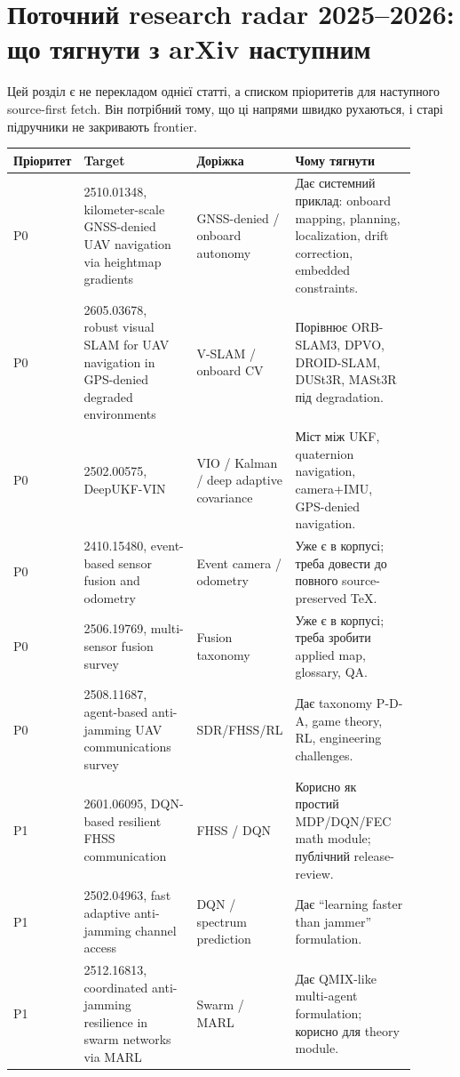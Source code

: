 \chapter{Поточний research radar 2025--2026: що тягнути з arXiv наступним}

Цей розділ є не перекладом однієї статті, а списком пріоритетів для наступного source-first fetch. Він потрібний тому, що ці напрями швидко рухаються, і старі підручники не закривають frontier.

\begin{longtable}{L{0.12\linewidth}L{0.28\linewidth}L{0.20\linewidth}L{0.30\linewidth}}
\toprule
Пріоритет & Target & Доріжка & Чому тягнути \\
\midrule
P0 & 2510.01348, kilometer-scale GNSS-denied UAV navigation via heightmap gradients & GNSS-denied / onboard autonomy & Дає системний приклад: onboard mapping, planning, localization, drift correction, embedded constraints. \\
P0 & 2605.03678, robust visual SLAM for UAV navigation in GPS-denied degraded environments & V-SLAM / onboard CV & Порівнює ORB-SLAM3, DPVO, DROID-SLAM, DUSt3R, MASt3R під degradation. \\
P0 & 2502.00575, DeepUKF-VIN & VIO / Kalman / deep adaptive covariance & Міст між UKF, quaternion navigation, camera+IMU, GPS-denied navigation. \\
P0 & 2410.15480, event-based sensor fusion and odometry & Event camera / odometry & Уже є в корпусі; треба довести до повного source-preserved TeX. \\
P0 & 2506.19769, multi-sensor fusion survey & Fusion taxonomy & Уже є в корпусі; треба зробити applied map, glossary, QA. \\
P0 & 2508.11687, agent-based anti-jamming UAV communications survey & SDR/FHSS/RL & Дає taxonomy P-D-A, game theory, RL, engineering challenges. \\
P1 & 2601.06095, DQN-based resilient FHSS communication & FHSS / DQN & Корисно як простий MDP/DQN/FEC math module; публічний release-review. \\
P1 & 2502.04963, fast adaptive anti-jamming channel access & DQN / spectrum prediction & Дає ``learning faster than jammer'' formulation. \\
P1 & 2512.16813, coordinated anti-jamming resilience in swarm networks via MARL & Swarm / MARL & Дає QMIX-like multi-agent formulation; корисно для theory module. \\

\end{longtable}
